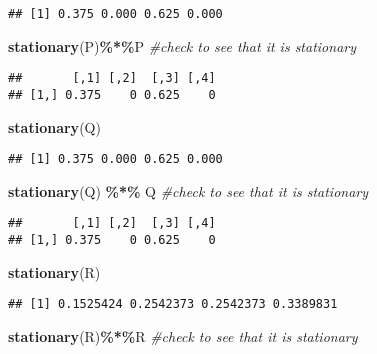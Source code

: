 \documentclass[
]{article}
\newenvironment{Shaded}{\begin{snugshade}}{\end{snugshade}}
\newcommand{\CommentTok}[1]{\textcolor[rgb]{0.56,0.35,0.01}{\textit{#1}}}
\newcommand{\FunctionTok}[1]{\textcolor[rgb]{0.13,0.29,0.53}{\textbf{#1}}}
\newcommand{\NormalTok}[1]{#1}
\newcommand{\SpecialCharTok}[1]{\textcolor[rgb]{0.81,0.36,0.00}{\textbf{#1}}}
\begin{document}
\begin{verbatim}
## [1] 0.375 0.000 0.625 0.000
\end{verbatim}

\begin{Shaded}
\begin{Highlighting}[]
\FunctionTok{stationary}\NormalTok{(P)}\SpecialCharTok{\%*\%}\NormalTok{P }\CommentTok{\#check to see that it is stationary}
\end{Highlighting}
\end{Shaded}

\begin{verbatim}
##       [,1] [,2]  [,3] [,4]
## [1,] 0.375    0 0.625    0
\end{verbatim}

\begin{Shaded}
\begin{Highlighting}[]
\FunctionTok{stationary}\NormalTok{(Q)}
\end{Highlighting}
\end{Shaded}

\begin{verbatim}
## [1] 0.375 0.000 0.625 0.000
\end{verbatim}

\begin{Shaded}
\begin{Highlighting}[]
\FunctionTok{stationary}\NormalTok{(Q) }\SpecialCharTok{\%*\%}\NormalTok{ Q }\CommentTok{\#check to see that it is stationary}
\end{Highlighting}
\end{Shaded}

\begin{verbatim}
##       [,1] [,2]  [,3] [,4]
## [1,] 0.375    0 0.625    0
\end{verbatim}

\begin{Shaded}
\begin{Highlighting}[]
\FunctionTok{stationary}\NormalTok{(R)}
\end{Highlighting}
\end{Shaded}

\begin{verbatim}
## [1] 0.1525424 0.2542373 0.2542373 0.3389831
\end{verbatim}

\begin{Shaded}
\begin{Highlighting}[]
\FunctionTok{stationary}\NormalTok{(R)}\SpecialCharTok{\%*\%}\NormalTok{R }\CommentTok{\#check to see that it is stationary}
\end{Highlighting}
\end{Shaded}
\end{document}
